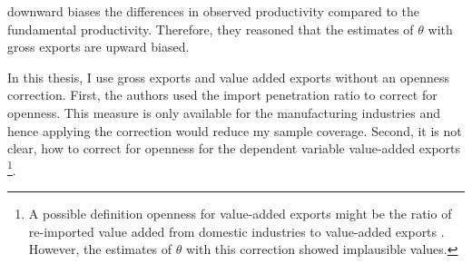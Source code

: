     downward biases the differences in observed productivity compared to the fundamental productivity.
     Therefore, they reasoned that the estimates of  $\theta$ with gross exports are upward biased. \par
    In this thesis, I use gross exports and value added exports without an openness correction.
     First, the authors used the import penetration ratio to correct for openness.
     This measure is only available for the manufacturing industries and hence applying the correction would reduce my sample coverage.
      Second, it is not clear, how to correct for openness for the dependent variable value-added exports  \footnote{ A possible definition openness for value-added exports might be the ratio of re-imported value added from domestic industries to value-added exports .
      However,  the estimates of $\theta$ with this correction showed implausible values.}.
